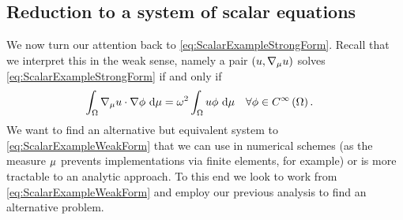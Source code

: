 \subsection{Reduction to a system of scalar equations} \label{sec:ScalarReduceEdgeEqns}
We now turn our attention back to \eqref{eq:ScalarExampleStrongForm}.
Recall that we interpret this in the weak sense, namely a pair $\left( u,\nabla_\mu u \right)$ solves \eqref{eq:ScalarExampleStrongForm} if and only if
\begin{align} \label{eq:ScalarExampleWeakForm}
	\int_{\Omega}\nabla_\mu u \cdot \nabla\phi \ \mathrm{d}\mu &= \omega^2\int_{\Omega}u\phi \ \mathrm{d}\mu \quad \forall\phi\in C^{\infty}\left( \Omega \right).
\end{align}
We want to find an alternative but equivalent system to \eqref{eq:ScalarExampleWeakForm} that we can use in numerical schemes (as the measure $\mu$ prevents implementations via finite elements, for example) or is more tractable to an analytic approach.
To this end we look to work from \eqref{eq:ScalarExampleWeakForm} and employ our previous analysis to find an alternative problem. \newline

